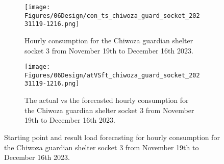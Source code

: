 \begin{figure}
    \begin{subfigure}{\textwidth}
    \centering
    \texttt{[image: Figures/06Design/con\_ts\_chiwoza\_guard\_socket\_20231119-1216.png]}
    \caption{Hourly consumption for the Chiwoza guardian shelter socket 3 from November 19th to December 16th 2023.}
    \label{fig:con_ts_chiwoza_guard_socket_20231119-1216}
  \end{subfigure}

  \vspace{0.5cm}

  \begin{subfigure}{\textwidth}
    \centering
    \texttt{[image: Figures/06Design/atVSft\_chiwoza\_guard\_socket\_20231119-1216.png]}
    \caption{The actual vs the forecasted hourly consumption for the Chiwoza guardian shelter socket 3 from November 19th to December 16th 2023.}
    \label{fig:atVSft_chiwoza_guard_socket_20231119-1216}
  \end{subfigure}

  \caption[Guardian shelter socket consumption forecasting]{Starting point and result load forecasting for hourly consumption for the Chiwoza guardian shelter socket 3 from November 19th to December 16th 2023.}
  \label{fig:forecasting_results_chiwoza_guard_socket}
\end{figure}

